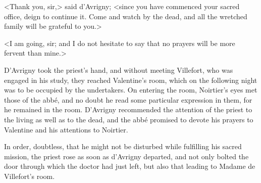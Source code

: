  <Thank you, sir,> said d'Avrigny; <since you have commenced your sacred office, deign to continue it. Come and watch by the dead, and all the wretched family will be grateful to you.> 

 <I am going, sir; and I do not hesitate to say that no prayers will be more fervent than mine.> 

 D'Avrigny took the priest's hand, and without meeting Villefort, who was engaged in his study, they reached Valentine's room, which on the following night was to be occupied by the undertakers. On entering the room, Noirtier's eyes met those of the abbé, and no doubt he read some particular expression in them, for he remained in the room. D'Avrigny recommended the attention of the priest to the living as well as to the dead, and the abbé promised to devote his prayers to Valentine and his attentions to Noirtier. 

 In order, doubtless, that he might not be disturbed while fulfilling his sacred mission, the priest rose as soon as d'Avrigny departed, and not only bolted the door through which the doctor had just left, but also that leading to Madame de Villefort's room. 